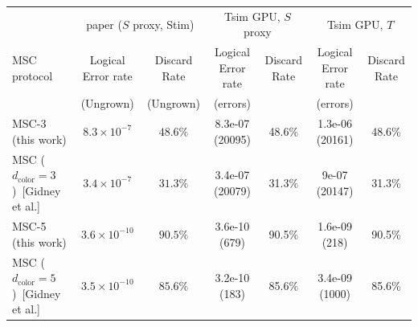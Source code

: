 \begin{tabular}{l cc | cc | cc}
\toprule
 & \multicolumn{2}{c|}{paper ($S$ proxy, Stim)} & \multicolumn{2}{c|}{Tsim GPU, $S$ proxy} & \multicolumn{2}{c}{Tsim GPU, $T$}\\
MSC protocol & Logical Error rate & Discard Rate & Logical Error rate & Discard Rate & Logical Error rate & Discard Rate\\
 & (Ungrown) & (Ungrown) & (errors) & & (errors) & \\
\midrule
MSC-3 (this work) & $8.3\times 10^{-7}$ & $48.6\%$ & 8.3e-07 (20095) & 48.6\% & 1.3e-06 (20161) & 48.6\% \\
MSC ($d_{\text{color}}=3$)~[Gidney et al.] & $3.4\times 10^{-7}$ & $31.3\%$ & 3.4e-07 (20079) & 31.3\% & 9e-07 (20147) & 31.3\% \\
MSC-5 (this work) & $3.6\times 10^{-10}$ & $90.5\%$ & 3.6e-10 (679) & 90.5\% & 1.6e-09 (218) & 90.5\% \\
MSC ($d_{\text{color}}=5$)~[Gidney et al.] & $3.5\times 10^{-10}$ & $85.6\%$ & 3.2e-10 (183) & 85.6\% & 3.4e-09 (1000) & 85.6\% \\
\bottomrule
\end{tabular}
